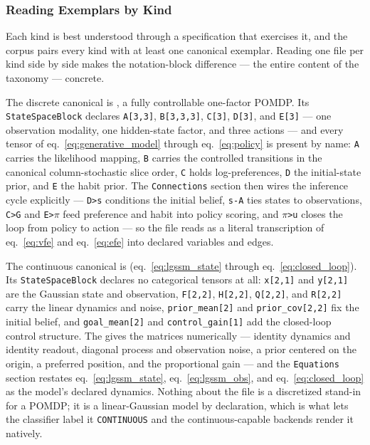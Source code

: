 \documentclass[
  english,
  9pt,
]{extarticle}
\begin{document}
\subsubsection{Reading Exemplars by
Kind}\label{reading-exemplars-by-kind}

Each kind is best understood through a specification that exercises it,
and the corpus pairs every kind with at least one canonical exemplar.
Reading one file per kind side by side makes the notation-block
difference --- the entire content of the taxonomy --- concrete.

The discrete canonical is
, a fully
controllable one-factor POMDP. Its \texttt{StateSpaceBlock} declares
\texttt{A{[}3,3{]}}, \texttt{B{[}3,3,3{]}}, \texttt{C{[}3{]}},
\texttt{D{[}3{]}}, and \texttt{E{[}3{]}} --- one observation modality,
one hidden-state factor, and three actions --- and every tensor of
eq.~\ref{eq:generative_model} through eq.~\ref{eq:policy} is present by
name: \texttt{A} carries the likelihood mapping, \texttt{B} carries the
controlled transitions in the canonical column-stochastic slice order,
\texttt{C} holds log-preferences, \texttt{D} the initial-state prior,
and \texttt{E} the habit prior. The \texttt{Connections} section then
wires the inference cycle explicitly --- \texttt{D\textgreater{}s}
conditions the initial belief, \texttt{s-A} ties states to observations,
\texttt{C\textgreater{}G} and \texttt{E\textgreater{}\texorpdfstring{\ensuremath{\pi}}{pi}} feed preference
and habit into policy scoring, and \texttt{\texorpdfstring{\ensuremath{\pi}}{pi}\textgreater{}u} closes the
loop from policy to action --- so the file reads as a literal
transcription of eq.~\ref{eq:vfe} and eq.~\ref{eq:efe} into declared
variables and edges.

The continuous canonical is
(eq.~\ref{eq:lgssm_state} through eq.~\ref{eq:closed_loop}). Its
\texttt{StateSpaceBlock} declares no categorical tensors at all:
\texttt{x{[}2,1{]}} and \texttt{y{[}2,1{]}} are the Gaussian state and
observation, \texttt{F{[}2,2{]}}, \texttt{H{[}2,2{]}},
\texttt{Q{[}2,2{]}}, and \texttt{R{[}2,2{]}} carry the linear dynamics
and noise, \texttt{prior\_mean{[}2{]}} and \texttt{prior\_cov{[}2,2{]}}
fix the initial belief, and \texttt{goal\_mean{[}2{]}} and
\texttt{control\_gain{[}1{]}} add the closed-loop control structure. The
 gives the matrices numerically ---
identity dynamics and identity readout, diagonal process and observation
noise, a prior centered on the origin, a preferred position, and the
proportional gain --- and the \texttt{Equations} section restates
eq.~\ref{eq:lgssm_state}, eq.~\ref{eq:lgssm_obs}, and
eq.~\ref{eq:closed_loop} as the model's declared dynamics. Nothing about
the file is a discretized stand-in for a POMDP; it is a linear-Gaussian
model by declaration, which is what lets the classifier label it
\texttt{CONTINUOUS} and the continuous-capable backends render it
natively.
\end{document}
